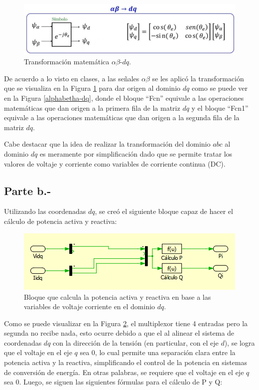 \begin{itemize}
    \begin{figure}
       \centering
       \includegraphics[width=0.5\linewidth]{Tarea 1/report/imagenes/p1a/formulaalphabetha-dq.png}
       \caption{Transformación matemática $\alpha\beta$-$dq$.}
       \label{formulaalphabetha-dq}
    \end{figure}

    De acuerdo a lo visto en clases, a las señales $\alpha\beta$ se les aplicó la transformación que se visualiza en la Figura \ref{formulaalphabetha-dq} para dar origen al dominio $dq$ como se puede ver en la Figura \ref{alphabetha-dq}, donde el bloque ``Fcn'' equivale a las operaciones matemáticas que dan origen a la primera fila de la matriz $dq$ y el bloque ``Fcn1''  equivale a las operaciones matemáticas que dan origen a la segunda fila de la matriz $dq$.
\end{itemize}

Cabe destacar que la idea de realizar la transformación del dominio $abc$ al dominio $dq$ es meramente por simplificación dado que se permite tratar los valores de voltaje y corriente como variables de corriente continua (DC).

\subsection{Parte b.-}

Utilizando las coordenadas $dq$, se creó el siguiente bloque capaz de hacer el cálculo de potencia activa y reactiva:

\begin{figure}
    \centering
    \includegraphics[width=0.5\linewidth]{Tarea 1/report/imagenes/p1b/bloquepq.png}
    \caption{Bloque que calcula la potencia activa y reactiva en base a las variables de voltaje corriente en el dominio $dq$.}
    \label{bloquepq}
\end{figure}

Como se puede visualizar en la Figura \ref{bloquepq}, el multiplexor tiene 4 entradas pero la segunda no recibe nada, esto ocurre debido a que el al alinear el sistema de coordenadas $dq$ con la dirección de la tensión (en particular, con el eje $d$), se logra que el voltaje en el eje $q$ sea 0, lo cual permite una separación clara entre la potencia activa y la reactiva, simplificando el control de la potencia en sistemas de conversión de energía. En otras palabras, se requiere que el voltaje en el eje $q$ sea 0. Luego, se siguen las siguientes fórmulas para el cálculo de P y Q:

